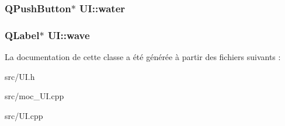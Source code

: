 \label{classUI_abf5a7181f1e80c8873cfae97be8e8b4f}
\hypertarget{classUI_aaa5e1351929c7da7d4ae82ddbc31c77b}{
\subsubsection[{water}]{\setlength{\rightskip}{0pt plus 5cm}QPushButton$\ast$ {\bf UI::water}}}
\label{classUI_aaa5e1351929c7da7d4ae82ddbc31c77b}
\hypertarget{classUI_a3f735d7d737b15dad131baf43b58eb17}{
\subsubsection[{wave}]{\setlength{\rightskip}{0pt plus 5cm}QLabel$\ast$ {\bf UI::wave}}}
\label{classUI_a3f735d7d737b15dad131baf43b58eb17}


La documentation de cette classe a été générée à partir des fichiers suivants :\begin{DoxyCompactItemize}
\item 
src/UI.h\item 
src/moc\_\-UI.cpp\item 
src/UI.cpp\end{DoxyCompactItemize}
